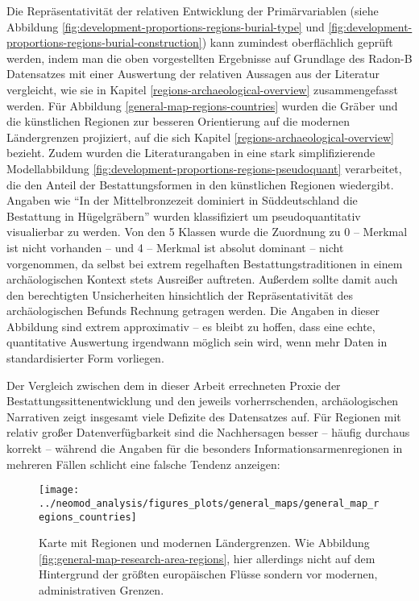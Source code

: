 \documentclass[openany,twoside,twocolumn]{book}
\begin{document}
Die Repräsentativität der relativen Entwicklung der Primärvariablen
(siehe Abbildung \ref{fig:development-proportions-regions-burial-type}
und \ref{fig:development-proportions-regions-burial-construction}) kann
zumindest oberflächlich geprüft werden, indem man die oben vorgestellten
Ergebnisse auf Grundlage des Radon-B Datensatzes mit einer Auswertung
der relativen Aussagen aus der Literatur vergleicht, wie sie in Kapitel
\ref{regions-archaeological-overview} zusammengefasst werden. Für
Abbildung \ref{general-map-regions-countries} wurden die Gräber und die
künstlichen Regionen zur besseren Orientierung auf die modernen
Ländergrenzen projiziert, auf die sich Kapitel
\ref{regions-archaeological-overview} bezieht. Zudem wurden die
Literaturangaben in eine stark simplifizierende Modellabbildung
\ref{fig:development-proportions-regions-pseudoquant} verarbeitet, die
den Anteil der Bestattungsformen in den künstlichen Regionen wiedergibt.
Angaben wie ``In der Mittelbronzezeit dominiert in Süddeutschland die
Bestattung in Hügelgräbern'' wurden klassifiziert um pseudoquantitativ
visualierbar zu werden. Von den 5 Klassen wurde die Zuordnung zu 0 --
Merkmal ist nicht vorhanden -- und 4 -- Merkmal ist absolut dominant --
nicht vorgenommen, da selbst bei extrem regelhaften
Bestattungstraditionen in einem archäologischen Kontext stets Ausreißer
auftreten. Außerdem sollte damit auch den berechtigten Unsicherheiten
hinsichtlich der Repräsentativität des archäologischen Befunds Rechnung
getragen werden. Die Angaben in dieser Abbildung sind extrem
approximativ -- es bleibt zu hoffen, dass eine echte, quantitative
Auswertung irgendwann möglich sein wird, wenn mehr Daten in
standardisierter Form vorliegen.

Der Vergleich zwischen dem in dieser Arbeit errechneten Proxie der
Bestattungssittenentwicklung und den jeweils vorherrschenden,
archäologischen Narrativen zeigt insgesamt viele Defizite des
Datensatzes auf. Für Regionen mit relativ großer Datenverfügbarkeit sind
die Nachhersagen besser -- häufig durchaus korrekt -- während die
Angaben für die besonders Informationsarmenregionen in mehreren Fällen
schlicht eine falsche Tendenz anzeigen:

\begin{figure}
\texttt{[image: ../neomod\_analysis/figures\_plots/general\_maps/general\_map\_regions\_countries]} \caption[Karte mit Regionen und modernen Ländergrenzen]{Karte mit Regionen und modernen Ländergrenzen. Wie Abbildung \ref{fig:general-map-research-area-regions}, hier allerdings nicht auf dem Hintergrund der größten europäischen Flüsse sondern vor modernen, administrativen Grenzen.}\label{fig:general-map-regions-countries}
\end{figure}
\end{document}
